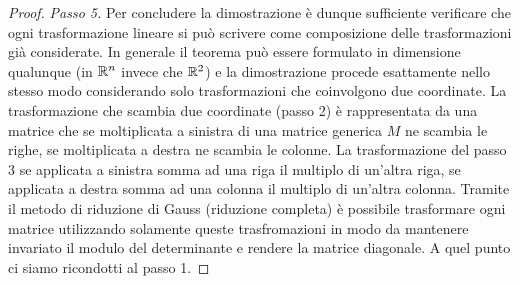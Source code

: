 \begin{proof}
\emph{Passo 5.}
Per concludere la dimostrazione è dunque sufficiente
verificare che ogni trasformazione lineare si può scrivere come composizione delle trasformazioni già considerate.
In generale il teorema può essere formulato in dimensione qualunque (in $\mathbb R^n$ invece che $\mathbb R^2$) e la dimostrazione procede esattamente nello stesso modo considerando solo trasformazioni che coinvolgono due coordinate. La trasformazione che scambia due coordinate (passo 2) è rappresentata da una matrice che se moltiplicata a sinistra di una matrice generica $M$ ne scambia le righe, se moltiplicata a destra ne scambia le colonne. La trasformazione del passo 3 se applicata a sinistra somma ad una riga il multiplo di un'altra riga, se applicata a destra somma ad una colonna il multiplo di un'altra colonna.
Tramite il metodo di riduzione di Gauss (riduzione completa) è possibile trasformare ogni matrice utilizzando solamente queste trasfromazioni in modo da mantenere invariato il modulo del determinante e rendere la matrice diagonale. A quel punto ci siamo ricondotti al passo 1.


\end{proof}
